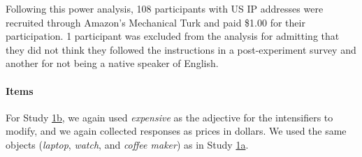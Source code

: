 \documentclass[10pt,letterpaper]{article}
\newcommand{\w}[1]{\emph{#1}}
\begin{document}
Following this power analysis, 108 participants with US IP addresses were recruited through Amazon’s Mechanical Turk and paid \$1.00 for their participation. 1 participant was excluded from the analysis for admitting that they did not think they followed the instructions in a post-experiment survey and another for not being a native speaker of English.

\paragraph{Items}

For Study \hyperref[sec:study1b]{1b}, we again used \w{expensive} as the adjective for the intensifiers to modify, and we again collected responses as prices in dollars.
We used the same objects (\w{laptop}, \w{watch}, and \w{coffee maker}) as in Study  \hyperref[sec:study1a]{1a}.
\end{document}
